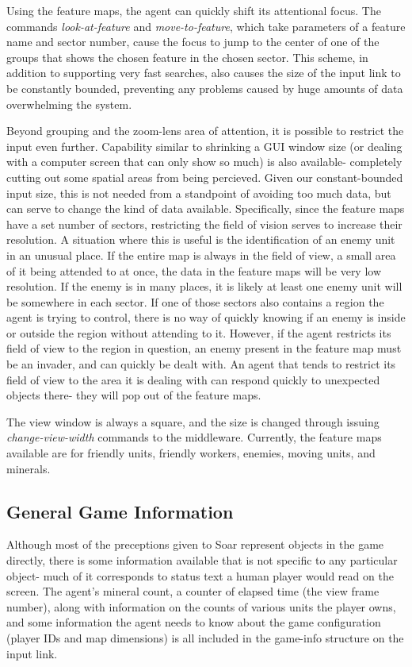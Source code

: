 Using the feature maps, the agent can quickly shift its attentional focus. The commands {\it look-at-feature} and {\it move-to-feature}, which take parameters of a feature name and sector number, cause the focus to jump to the center of one of the groups that shows the chosen feature in the chosen sector. This scheme, in addition to supporting very fast searches, also causes the size of the input link to be constantly bounded, preventing any problems caused by huge amounts of data overwhelming the system.

Beyond grouping and the zoom-lens area of attention, it is possible to restrict the input even further. Capability similar to shrinking a GUI window size (or dealing with a computer screen that can only show so much) is also available- completely cutting out some spatial areas from being percieved. Given our constant-bounded input size, this is not needed from a standpoint of avoiding too much data, but can serve to change the kind of data available. Specifically, since the feature maps have a set number of sectors, restricting the field of vision serves to increase their resolution. A situation where this is useful is the identification of an enemy unit in an unusual place. If the entire map is always in the field of view, a small area of it being attended to at once, the data in the feature maps will be very low resolution. If the enemy is in many places, it is likely at least one enemy unit will be somewhere in each sector. If one of those sectors also contains a region the agent is trying to control, there is no way of quickly knowing if an enemy is inside or outside the region without attending to it. However, if the agent restricts its field of view to the region in question, an enemy present in the feature map must be an invader, and can quickly be dealt with. An agent that tends to restrict its field of view to the area it is dealing with can respond quickly to unexpected objects there- they will pop out of the feature maps.

The view window is always a square, and the size is changed through issuing {\it change-view-width} commands to the middleware. Currently, the feature maps available are for friendly units, friendly workers, enemies, moving units, and minerals.

\subsection{General Game Information}

Although most of the preceptions given to Soar represent objects in the game directly, there is some information available that is not specific to any particular object- much of it corresponds to status text a human player would read on the screen. The agent's mineral count, a counter of elapsed time (the view frame number), along with information on the counts of various units the player owns, and some information the agent needs to know about the game configuration (player IDs and map dimensions) is all included in the game-info structure on the input link.

